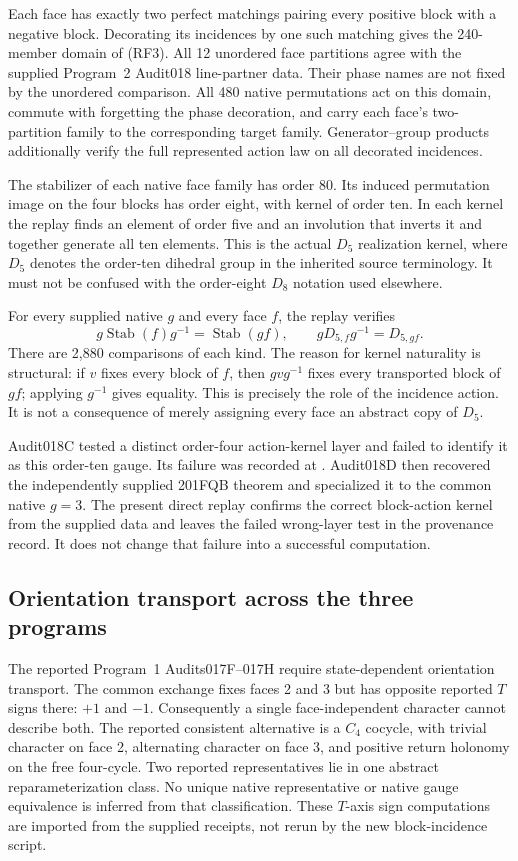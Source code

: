 Each face has exactly two perfect matchings pairing every positive block with a negative block. Decorating its incidences by one such matching gives the 240-member domain of (RF3). All 12 unordered face partitions agree with the supplied Program~2 Audit018 line-partner data. Their phase names are not fixed by the unordered comparison. All 480 native permutations act on this domain, commute with forgetting the phase decoration, and carry each face's two-partition family to the corresponding target family. Generator--group products additionally verify the full represented action law on all decorated incidences.

The stabilizer of each native face family has order 80. Its induced permutation image on the four blocks has order eight, with kernel of order ten. In each kernel the replay finds an element of order five and an involution that inverts it and together generate all ten elements. This is the actual $D_5$ realization kernel, where $D_5$ denotes the order-ten dihedral group in the inherited source terminology. It must not be confused with the order-eight $D_8$ notation used elsewhere.

For every supplied native $g$ and every face $f$, the replay verifies
\[
g\operatorname{Stab}(f)g^{-1}=\operatorname{Stab}(gf),\qquad
gD_{5,f}g^{-1}=D_{5,gf}.
\]
There are 2,880 comparisons of each kind. The reason for kernel naturality is structural: if $v$ fixes every block of $f$, then $gvg^{-1}$ fixes every transported block of $gf$; applying $g^{-1}$ gives equality. This is precisely the role of the incidence action. It is not a consequence of merely assigning every face an abstract copy of $D_5$.

Audit018C tested a distinct order-four action-kernel layer and failed to identify it as this order-ten gauge. Its failure was recorded at . Audit018D then recovered the independently supplied 201FQB theorem and specialized it to the common native $g=3$. The present direct replay confirms the correct block-action kernel from the supplied data and leaves the failed wrong-layer test in the provenance record. It does not change that failure into a successful computation.

\subsection{Orientation transport across the three programs}
The reported Program~1 Audits017F--017H require state-dependent orientation transport. The common exchange fixes faces 2 and 3 but has opposite reported $T$ signs there: $+1$ and $-1$. Consequently a single face-independent character cannot describe both. The reported consistent alternative is a $C_4$ cocycle, with trivial character on face 2, alternating character on face 3, and positive return holonomy on the free four-cycle. Two reported representatives lie in one abstract reparameterization class. No unique native representative or native gauge equivalence is inferred from that classification. These $T$-axis sign computations are imported from the supplied receipts, not rerun by the new block-incidence script.

